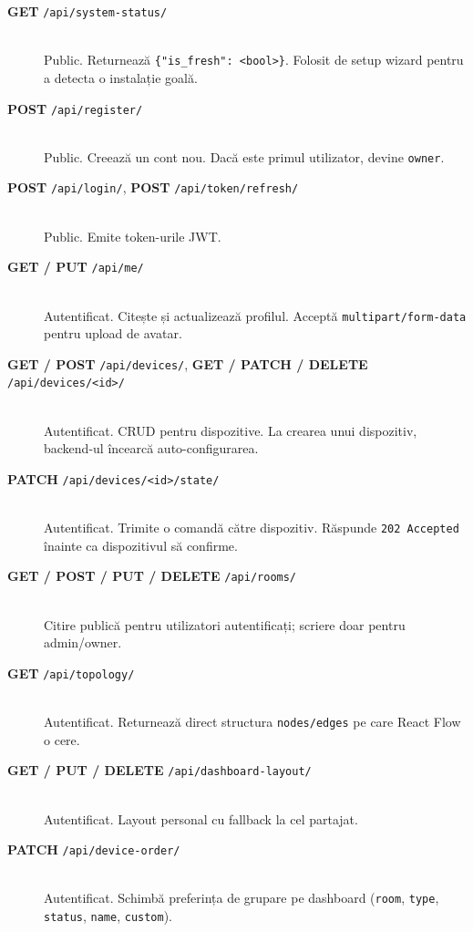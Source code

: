 \begin{description}
    \item[\textbf{GET} \texttt{/api/system-status/}] \hfill \\
    Public. Returnează \texttt{\{"is\_fresh": <bool>\}}. Folosit de setup wizard pentru a detecta o instalație goală.
    \item[\textbf{POST} \texttt{/api/register/}] \hfill \\
    Public. Creează un cont nou. Dacă este primul utilizator, devine \texttt{owner}.
    \item[\textbf{POST} \texttt{/api/login/}, \textbf{POST} \texttt{/api/token/refresh/}] \hfill \\
    Public. Emite token-urile JWT.
    \item[\textbf{GET / PUT} \texttt{/api/me/}] \hfill \\
    Autentificat. Citește și actualizează profilul. Acceptă \texttt{multipart/form-data} pentru upload de avatar.
    \item[\textbf{GET / POST} \texttt{/api/devices/}, \textbf{GET / PATCH / DELETE} \texttt{/api/devices/<id>/}] \hfill \\
    Autentificat. CRUD pentru dispozitive. La crearea unui dispozitiv, backend-ul încearcă auto-configurarea.
    \item[\textbf{PATCH} \texttt{/api/devices/<id>/state/}] \hfill \\
    Autentificat. Trimite o comandă către dispozitiv. Răspunde \texttt{202 Accepted} înainte ca dispozitivul să confirme.
    \item[\textbf{GET / POST / PUT / DELETE} \texttt{/api/rooms/}] \hfill \\
    Citire publică pentru utilizatori autentificați; scriere doar pentru admin/owner.
    \item[\textbf{GET} \texttt{/api/topology/}] \hfill \\
    Autentificat. Returnează direct structura \texttt{nodes/edges} pe care React Flow o cere.
    \item[\textbf{GET / PUT / DELETE} \texttt{/api/dashboard-layout/}] \hfill \\
    Autentificat. Layout personal cu fallback la cel partajat.
    \item[\textbf{PATCH} \texttt{/api/device-order/}] \hfill \\
    Autentificat. Schimbă preferința de grupare pe dashboard (\texttt{room}, \texttt{type}, \texttt{status}, \texttt{name}, \texttt{custom}).
\end{description}

